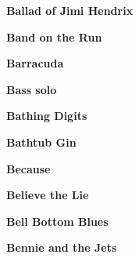 \begin{center}\textbf{Ballad of Jimi Hendrix}\end{center}
\newline
\vspace{10pt} 
\begin{center}\textbf{Band on the Run}\end{center}
\newline
\vspace{10pt} 
\begin{center}\textbf{Barracuda}\end{center}
\newline
\vspace{10pt} 
\begin{center}\textbf{Bass solo}\end{center}
\newline
\vspace{10pt} 
\begin{center}\textbf{Bathing Digits}\end{center}
\newline
\vspace{10pt} 
\begin{center}\textbf{Bathtub Gin}\end{center}
\newline
\vspace{10pt} 
\begin{center}\textbf{Because}\end{center}
\newline
\vspace{10pt} 
\begin{center}\textbf{Believe the Lie}\end{center}
\newline
\vspace{10pt} 
\begin{center}\textbf{Bell Bottom Blues}\end{center}
\newline
\vspace{10pt} 
\begin{center}\textbf{Bennie and the Jets}\end{center}
\newline
